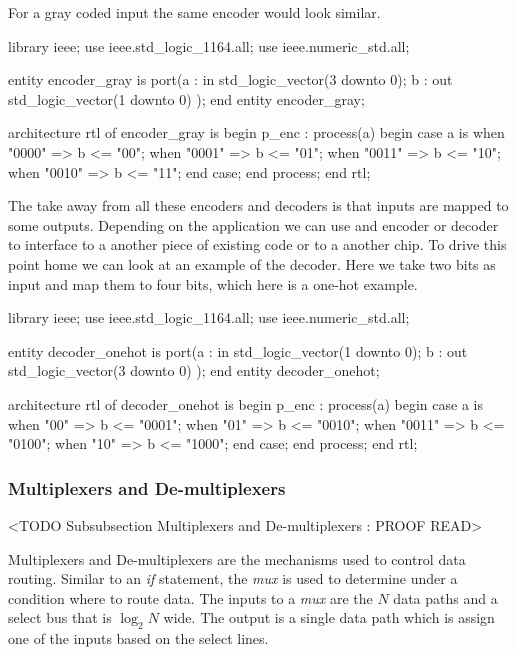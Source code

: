 For a gray coded input the same encoder would look similar.

\begin{VHDLlisting}[tabsize=4]
library ieee;
  use ieee.std_logic_1164.all;
  use ieee.numeric_std.all;
  
entity encoder_gray is
port(a : in    std_logic_vector(3 downto 0);
     b :   out std_logic_vector(1 downto 0)
);
end entity encoder_gray;

architecture rtl of encoder_gray is
begin
	p_enc : process(a)
	begin
		case a is	
			when "0000" => 
				b <= "00";
			when "0001" => 
				b <= "01";
			when "0011" => 
				b <= "10";
			when "0010" => 
				b <= "11";
		end case;
	end process;
end rtl;
\end{VHDLlisting}
	
The take away from all these encoders and decoders is that inputs are mapped to some outputs. Depending on the application we can use and encoder or decoder to interface to a another piece of existing code or to a another chip. To drive this point home we can look at an example of the decoder. Here we take two bits as input and map them to four bits, which here is a one-hot example.

\begin{VHDLlisting}[tabsize=4]
library ieee;
  use ieee.std_logic_1164.all;
  use ieee.numeric_std.all;
  
entity decoder_onehot is
port(a : in    std_logic_vector(1 downto 0);
     b :   out std_logic_vector(3 downto 0)
);
end entity decoder_onehot;

architecture rtl of decoder_onehot is
begin
	p_enc : process(a)
	begin
		case a is	
			when "00" => 
				b <= "0001";
			when "01" => 
				b <= "0010";
			when "0011" => 
				b <= "0100";
			when "10" => 
				b <= "1000";
		end case;
	end process;
end rtl;
\end{VHDLlisting}

\subsubsection{Multiplexers and De-multiplexers}
	<TODO Subsubsection  Multiplexers and De-multiplexers : PROOF READ>
	
Multiplexers and De-multiplexers are the mechanisms used to control data routing. Similar to an \emph{if} statement, the \emph{mux} is used to determine under a condition where to route data. The inputs to a \emph{mux} are the $N$ data paths and a select bus that is $\log_{2}N$ wide. The output is a single data path which is assign one of the inputs based on the select lines. 

